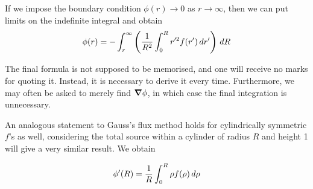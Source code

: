 \documentclass{../../template/note}
\begin{document}
    \begin{remark*}
        If we impose the boundary condition \(\phi(r) \to 0\) as \(r \to \infty\), then we can put limits on the indefinite integral and obtain
        \begin{align*}
            \phi(r) = -\int_r^\infty \left(\frac 1{R^2} \int_0^R r'^2 f(r') \,d{r}'\right) \,d{R}
        \end{align*}
    \end{remark*}
    
    \begin{remark*}
        The final formula is not supposed to be memorised, and one will receive no marks for quoting it. Instead, it is necessary to derive it every time. Furthermore, we may often be asked to merely find \(\grad \phi\), in which case the final integration is unnecessary.
    \end{remark*}
    
    An analogous statement to Gauss's flux method holds for cylindrically symmetric \(f\)'s as well, considering the total source within a cylinder of radius \(R\) and height 1 will give a very similar result. We obtain

    \begin{align*}
        \phi'(R) = \frac 1 R \int_0^R \rho f(\rho) \,d{\rho}
    \end{align*}
    
\end{document}
